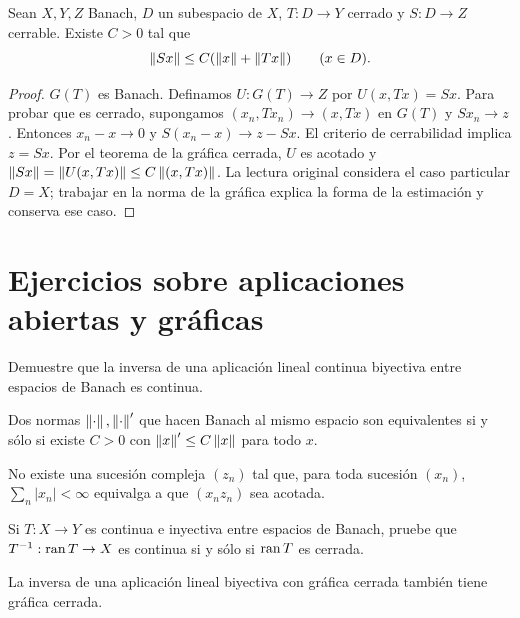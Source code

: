 \begin{teorema}\label{v3:hormander}
Sean $X,Y,Z$ Banach, $D$ un subespacio de $X$, $T:D\to Y$ cerrado y $S:D\to Z$ cerrable. Existe $C>0$ tal que
\[\left\lVert Sx\right\rVert\le C(\left\lVert x\right\rVert+\left\lVert Tx\right\rVert)\qquad(x\in D).
\]
\end{teorema}
\begin{proof}
$G(T)$ es Banach. Definamos $U:G(T)\to Z$ por $U(x,Tx)=Sx$. Para probar que es cerrado, supongamos $(x_n,Tx_n)\to(x,Tx)$ en $G(T)$ y $Sx_n\to z$. Entonces $x_n-x\to0$ y $S(x_n-x)\to z-Sx$. El criterio de cerrabilidad implica $z=Sx$. Por el teorema de la gráfica cerrada, $U$ es acotado y
$\left\lVert Sx\right\rVert=\left\lVert U(x,Tx)\right\rVert\le C\left\lVert(x,Tx)\right\rVert$. La lectura original considera el caso particular $D=X$; trabajar en la norma de la gráfica explica la forma de la estimación y conserva ese caso.
\end{proof}

\section{Ejercicios sobre aplicaciones abiertas y gráficas}
\begin{ejercicio}\label{ej:v3-l03-1}
Demuestre que la inversa de una aplicación lineal continua biyectiva entre espacios de Banach es continua.
\end{ejercicio}


\begin{ejercicio}\label{ej:v3-l03-2}
Dos normas $\left\lVert\cdot\right\rVert,\left\lVert\cdot\right\rVert'$ que hacen Banach al mismo espacio son equivalentes si y sólo si existe $C>0$ con $\left\lVert x\right\rVert'\le C\left\lVert x\right\rVert$ para todo $x$.
\end{ejercicio}


\begin{ejercicio}\label{ej:v3-l03-3}
No existe una sucesión compleja $(z_n)$ tal que, para toda sucesión $(x_n)$, $\sum_n|x_n|<\infty$ equivalga a que $(x_nz_n)$ sea acotada.
\end{ejercicio}


\begin{ejercicio}\label{ej:v3-l03-4}
Si $T:X\to Y$ es continua e inyectiva entre espacios de Banach, pruebe que $T^{-1}:\operatorname{ran} T\to X$ es continua si y sólo si $\operatorname{ran} T$ es cerrada.
\end{ejercicio}


\begin{ejercicio}\label{ej:v3-l03-5}
La inversa de una aplicación lineal biyectiva con gráfica cerrada también tiene gráfica cerrada.
\end{ejercicio}



